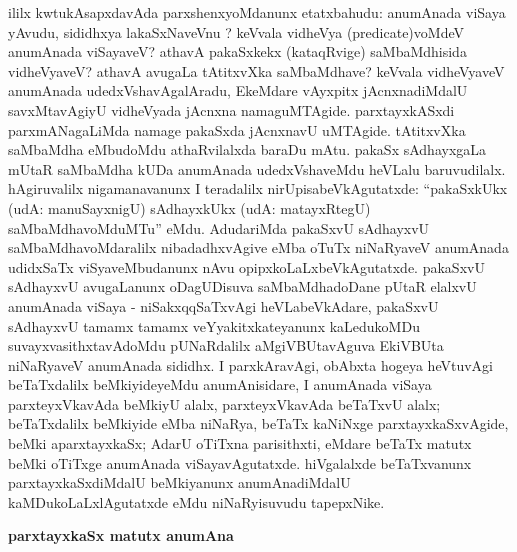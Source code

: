 ililx kwtukAsapxdavAda parxshenxyoMdanunx etatxbahudu: anumAnada viSaya yAvudu, sididhxya lakaSxNaveVnu ? keVvala vidheVya {\rm(predicate)}voMdeV anumAnada viSayaveV? athavA pakaSxkekx (kataqRvige) saMbaMdhisida vidheVyaveV? athavA avugaLa tAtitxvXka saMbaMdhave? keVvala vidheVyaveV anumAnada udedxVshavAgalAradu, EkeMdare vAyxpitx jAcnxnadiMdalU savxMtavAgiyU vidheVyada jAcnxna namaguMTAgide. parxtayxkASxdi parxmANagaLiMda namage pakaSxda jAcnxnavU uMTAgide. tAtitxvXka saMbaMdha eMbudoMdu athaRvilalxda baraDu mAtu. pakaSx sAdhayxgaLa mUtaR saMbaMdha kUDa anumAnada udedxVshaveMdu heVLalu baruvudilalx. hAgiruvalilx nigamanavanunx I teradalilx nirUpisabeVkAgutatxde: ``pakaSxkUkx (udA: manuSayxnigU) sAdhayxkUkx (udA: matayxRtegU) saMbaMdhavoMduMTu'' eMdu. AdudariMda pakaSxvU sAdhayxvU saMbaMdhavoMdaralilx nibadadhxvAgive eMba oTuTx niNaRyaveV anumAnada udidxSaTx viSyaveMbudanunx nAvu opipxkoLaLxbeVkAgutatxde. pakaSxvU sAdhayxvU avugaLanunx oDagUDisuva saMbaMdhadoDane pUtaR elalxvU anumAnada viSaya - niSakxqqSaTxvAgi heVLabeVkAdare, pakaSxvU sAdhayxvU tamamx tamamx veYyakitxkateyanunx kaLedukoMDu suvayxvasithxtavAdoMdu pUNaRdalilx aMgiVBUtavAguva EkiVBUta niNaRyaveV anumAnada sididhx. I parxkAravAgi, obAbxta hogeya heVtuvAgi beTaTxdalilx beMkiyideyeMdu anumAnisidare, I anumAnada viSaya parxteyxVkavAda beMkiyU alalx, parxteyxVkavAda beTaTxvU alalx; beTaTxdalilx beMkiyide eMba niNaRya, beTaTx kaNiNxge parxtayxkaSxvAgide, beMki aparxtayxkaSx; AdarU oTiTxna parisithxti, eMdare beTaTx matutx beMki oTiTxge anumAnada viSayavAgutatxde. hiVgalalxde beTaTxvanunx parxtayxkaSxdiMdalU beMkiyanunx anumAnadiMdalU kaMDukoLaLxlAgutatxde eMdu niNaRyisuvudu tapepxNike.

\bigskip
\begin{center}
{\Large\bf parxtayxkaSx matutx anumAna}
\end{center}

